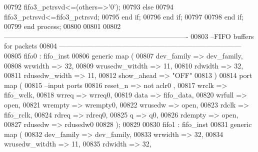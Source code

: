 \begin{DoxyCode}
00792               \textcolor{vhdlchar}{fifo3_pctrsvd}\textcolor{vhdlchar}{<=}\textcolor{vhdlchar}{(}\textcolor{keywordflow}{others}\textcolor{vhdlchar}{=}\textcolor{vhdlchar}{>}\textcolor{vhdlchar}{'}\textcolor{vhdllogic}{}\textcolor{vhdllogic}{0}\textcolor{vhdlchar}{'}\textcolor{vhdlchar}{)};
00793             \textcolor{keywordflow}{else}  
00794               \textcolor{vhdlchar}{fifo3_pctrsvd}\textcolor{vhdlchar}{<=}\textcolor{vhdlchar}{fifo3_pctrsvd};
00795             \textcolor{keywordflow}{end} \textcolor{keywordflow}{if};
00796           \textcolor{keywordflow}{end} \textcolor{keywordflow}{if};           
00797 
00798         \textcolor{keywordflow}{end} \textcolor{keywordflow}{if};
00799     \textcolor{keywordflow}{end} \textcolor{keywordflow}{process};      
00800 
00801   
00802 \textcolor{keyword}{-------------------------------------------------------------------------------}
00803 \textcolor{keyword}{--FIFO buffers for packets}
00804 \textcolor{keyword}{------------------------------------------------------------------------------  }
00805   fifo0 :  fifo_inst 
00806   \textcolor{keywordflow}{generic} \textcolor{keywordflow}{map} (
00807             dev_family      => dev_family, 
00808             wrwidth         => \textcolor{vhdllogic}{32}, 
00809             wrusedw_witdth  => \textcolor{vhdllogic}{11}, 
00810             rdwidth         => \textcolor{vhdllogic}{32}, 
00811             rdusedw_width   => \textcolor{vhdllogic}{11},
00812             show_ahead      => \textcolor{keyword}{"OFF"}
00813   \textcolor{vhdlchar}{)}  
00814   \textcolor{keywordflow}{port} \textcolor{keywordflow}{map} (
00815 \textcolor{keyword}{      --input ports }
00816       reset_n       => \textcolor{keywordflow}{not} aclr0 , 
00817       wrclk         => fifo_wclk,
00818       wrreq         => wrreq0,
00819       data          => fifo_data, 
00820       wrfull        => \textcolor{keywordflow}{open},
00821         wrempty       => wrempty0, 
00822       wrusedw       => \textcolor{keywordflow}{open},
00823       rdclk          => fifo_rclk,
00824       rdreq         => rdreq0,
00825       q             => q0,
00826       rdempty       => \textcolor{keywordflow}{open},
00827       rdusedw       => rdusedw0     
00828         \textcolor{vhdlchar}{)};
00829   
00830     fifo1 :  fifo_inst 
00831   \textcolor{keywordflow}{generic} \textcolor{keywordflow}{map} (
00832             dev_family      => dev_family, 
00833             wrwidth         => \textcolor{vhdllogic}{32}, 
00834             wrusedw_witdth  => \textcolor{vhdllogic}{11}, 
00835             rdwidth         => \textcolor{vhdllogic}{32}, 

\end{DoxyCode}
